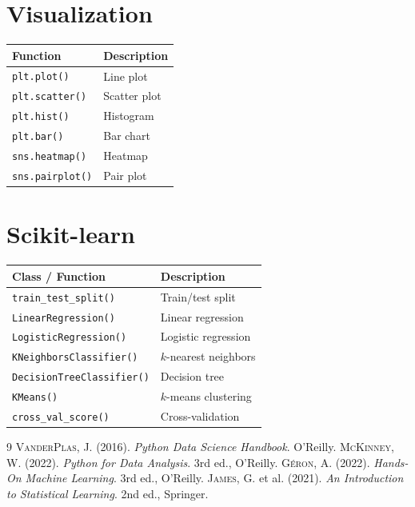 \documentclass[12pt,a4paper,twoside]{book}
\theoremstyle{definition}
\theoremstyle{plain}
\theoremstyle{remark}
\newcommand{\py}[1]{\texttt{#1}}
\begin{document}
\section{Visualization}
\begin{tabular}{ll}
\toprule
\textbf{Function} & \textbf{Description} \\
\midrule
\py{plt.plot()} & Line plot \\
\py{plt.scatter()} & Scatter plot \\
\py{plt.hist()} & Histogram \\
\py{plt.bar()} & Bar chart \\
\py{sns.heatmap()} & Heatmap \\
\py{sns.pairplot()} & Pair plot \\
\bottomrule
\end{tabular}

\section{Scikit-learn}
\begin{tabular}{ll}
\toprule
\textbf{Class / Function} & \textbf{Description} \\
\midrule
\py{train_test_split()} & Train/test split \\
\py{LinearRegression()} & Linear regression \\
\py{LogisticRegression()} & Logistic regression \\
\py{KNeighborsClassifier()} & $k$-nearest neighbors \\
\py{DecisionTreeClassifier()} & Decision tree \\
\py{KMeans()} & $k$-means clustering \\
\py{cross_val_score()} & Cross-validation \\
\bottomrule
\end{tabular}

\begin{thebibliography}{9}
 \textsc{VanderPlas}, J. (2016). \emph{Python Data Science Handbook}. O'Reilly.
 \textsc{McKinney}, W. (2022). \emph{Python for Data Analysis}. 3rd ed., O'Reilly.
 \textsc{G\'eron}, A. (2022). \emph{Hands-On Machine Learning}. 3rd ed., O'Reilly.
 \textsc{James}, G. et al. (2021). \emph{An Introduction to Statistical Learning}. 2nd ed., Springer.
\end{thebibliography}

\printindex
\end{document}
